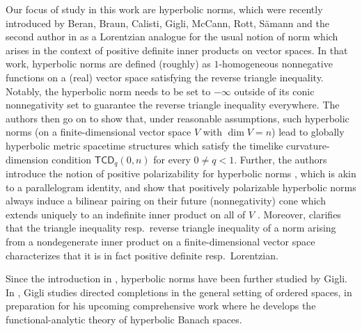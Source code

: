 \documentclass[a4paper,11pt]{article}
\numberwithin{equation}{section}
\theoremstyle{definition}
\theoremstyle{plain}
\begin{document}
Our focus of study in this work are hyperbolic norms, which were recently introduced by Beran, Braun, Calisti, Gigli, McCann, Rott, Sämann and the second author in \cite[App.\ A.3]{beran2024nonlinear} as a Lorentzian analogue for the usual notion of norm which arises in the context of positive definite inner products on vector spaces. In that work, hyperbolic norms are defined (roughly) as $1$-homogeneous nonnegative functions on a (real) vector space satisfying the reverse triangle inequality. Notably, the hyperbolic norm needs to be set to $-\infty$ outside of its conic nonnegativity set to guarantee the reverse triangle inequality everywhere. The authors then go on to show that, under reasonable assumptions, such hyperbolic norms (on a finite-dimensional vector space $V$ with $\dim V = n$) lead to globally hyperbolic metric spacetime structures \cite[Lem.\ A.10]{beran2024nonlinear} which satisfy the timelike curvature-dimension condition $\mathsf{TCD}_q(0,n)$ for every $0 \neq q < 1$. Further, the authors introduce the notion of positive polarizability for hyperbolic norms \cite[Eq.\ (A.14)]{beran2024nonlinear}, which is akin to a parallelogram identity, and show that positively polarizable hyperbolic norms always induce a bilinear pairing on their future (nonnegativity) cone which extends uniquely to an indefinite inner product on all of $V$ \cite[Lem.\ A.12]{beran2024nonlinear}. Moreover, \cite[Lem.\ A.13]{beran2024nonlinear} clarifies that the triangle inequality resp.\ reverse triangle inequality of a norm arising from a nondegenerate inner product on a finite-dimensional vector space characterizes that it is in fact positive definite resp.\ Lorentzian. 

Since the introduction in \cite{beran2024nonlinear}, hyperbolic norms have been further studied by Gigli. In \cite{gigli2025hyperbolic}, Gigli studies directed completions in the general setting of ordered spaces, in preparation for his upcoming comprehensive work \cite{gigli2025hyperbolic2} where he develops the functional-analytic theory of hyperbolic Banach spaces.
\end{document}
